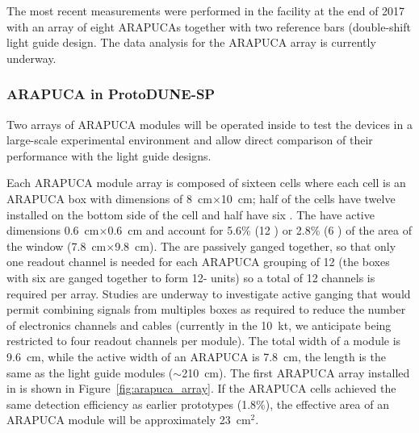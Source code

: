 The most recent measurements were performed in the  facility at the end of 2017 with an array of eight ARAPUCAs together with two reference bars (double-shift light guide design. The data analysis for the ARAPUCA array is currently underway. 


\subsubsection{ARAPUCA in ProtoDUNE-SP}

Two arrays of ARAPUCA modules will be operated inside  to test the devices in a large-scale experimental environment and allow direct comparison of their performance with the light guide designs. 
 
Each  ARAPUCA module array is composed of sixteen cells where each cell is an ARAPUCA box with dimensions of \SI{8}{cm}$\times$\SI{10}{cm}; half of the cells have twelve  installed on the bottom side of the cell and  half have six . The  have active dimensions \SI{0.6}{cm}$\times$\SI{0.6}{cm} and account for 5.6\% (\num{12} ) or \num{2.8}\% (\num{6} ) of the area of the window (\SI{7.8}{cm}$\times$\SI{9.8}{cm}).
The   are passively ganged together, so that only one readout channel is needed for each ARAPUCA grouping of \num{12}  (the boxes with six  are ganged together to form \num{12}- units) so a total of \num{12} channels is required per array. Studies are underway to investigate active ganging that would permit combining signals from multiples boxes as required to reduce the number of electronics channels and cables (currently in the  \SI{10}{kt}, we anticipate being restricted to four readout channels per  module). 
The total width of a module is \SI{9.6}{cm}, while the active width of an ARAPUCA is \SI{7.8}{cm}, the length is the same as the light guide modules ($\sim$\SI{210}{cm}). 
The first ARAPUCA array installed in  is shown in Figure~\ref{fig:arapuca_array}. If the ARAPUCA cells achieved the same detection efficiency as earlier prototypes (1.8\%), the effective area of an ARAPUCA module will be approximately \SI{23}{cm$^2$}.

